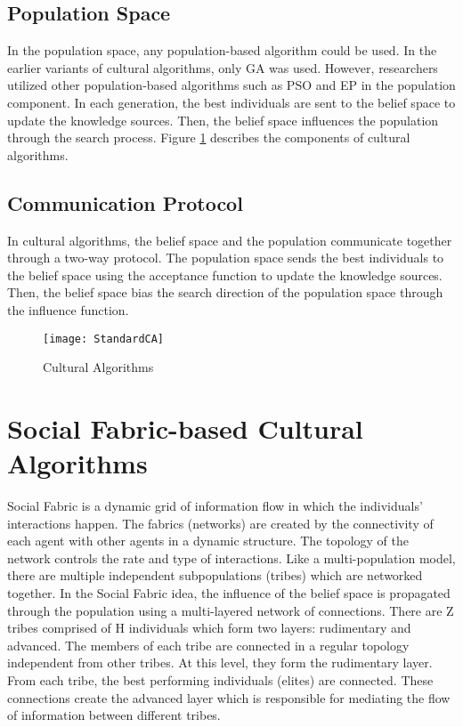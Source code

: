 \subsection{Population Space}
In the population space, any population-based algorithm could be used. In the earlier variants of cultural algorithms, only GA was used. However, researchers utilized other population-based algorithms such as PSO and EP in the population component. In each generation, the best individuals are sent to the belief space to update the knowledge sources. Then, the belief space influences the population through the search process. Figure \ref{fig:StandardCA} describes the components of cultural algorithms.
\subsection{Communication Protocol}
In cultural algorithms, the belief space and the population communicate together through a two-way protocol. The population space sends the best individuals to the belief space using the acceptance function to update the knowledge sources. Then, the belief space bias the search direction of the population space through the influence function.
\begin{figure}[h]
	\texttt{[image: StandardCA]}
	\centering
	\caption{Cultural Algorithms \cite{gg}}
	\label{fig:StandardCA}
\end{figure}
\section{Social Fabric-based Cultural Algorithms}
Social Fabric is a dynamic grid of information flow in which the individuals’ interactions happen. The fabrics (networks) are created by the connectivity of each agent with other agents in a dynamic structure. The topology of the network controls the rate and type of interactions. Like a multi-population model, there are multiple independent subpopulations (tribes) which are networked together.\newline
In the Social Fabric idea, the influence of the belief space is propagated through the population using a multi-layered network of connections. There are Z tribes comprised of H individuals which form two layers: rudimentary and advanced. The members of each tribe are connected in a regular topology independent from other tribes. At this level, they form the rudimentary layer. From each tribe, the best performing individuals (elites) are connected. These connections create the advanced layer which is responsible for mediating the flow of information between different tribes.
